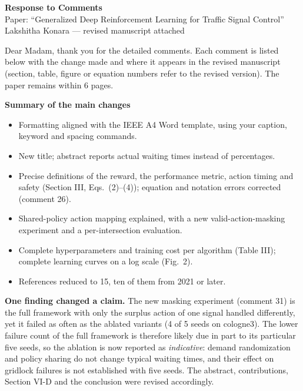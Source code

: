 \documentclass[11pt,a4paper]{article}
\begin{document}
\sloppy

\begin{center}
{\Large\textbf{Response to Comments}}\\[4pt]
Paper: ``Generalized Deep Reinforcement Learning for Traffic Signal Control''\\
Lakshitha Konara --- revised manuscript attached
\end{center}

Dear Madam, thank you for the detailed comments. Each comment is listed below with the change made and where it appears in the revised manuscript (section, table, figure or equation numbers refer to the revised version). The paper remains within 6 pages.

\textbf{Summary of the main changes}
\begin{itemize}[nosep]
  \item Formatting aligned with the IEEE A4 Word template, using your caption, keyword and spacing commands.
  \item New title; abstract reports actual waiting times instead of percentages.
  \item Precise definitions of the reward, the performance metric, action timing and safety (Section III, Eqs.~(2)--(4)); equation and notation errors corrected (comment 26).
  \item Shared-policy action mapping explained, with a new valid-action-masking experiment and a per-intersection evaluation.
  \item Complete hyperparameters and training cost per algorithm (Table III); complete learning curves on a log scale (Fig.~2).
  \item References reduced to 15, ten of them from 2021 or later.
\end{itemize}

\textbf{One finding changed a claim.} The new masking experiment (comment 31) is the full framework with only the surplus action of one signal handled differently, yet it failed as often as the ablated variants (4 of 5 seeds on cologne3). The lower failure count of the full framework is therefore likely due in part to its particular five seeds, so the ablation is now reported as \emph{indicative}: demand randomization and policy sharing do not change typical waiting times, and their effect on gridlock failures is not established with five seeds. The abstract, contributions, Section VI-D and the conclusion were revised accordingly.
\end{document}
